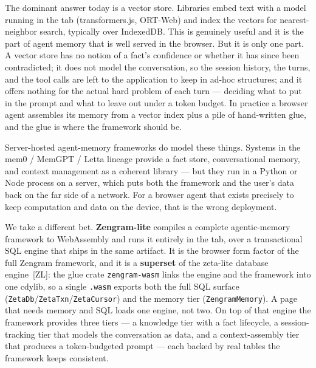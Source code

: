 \documentclass[11pt]{article}
\newcommand{\code}[1]{\texttt{#1}}
\begin{document}
The dominant answer today is a vector store. Libraries embed text with a model
running in the tab (transformers.js, ORT-Web) and index the vectors for
nearest-neighbor search, typically over IndexedDB. This is genuinely useful and
it is the part of agent memory that is well served in the browser. But it is only
one part. A vector store has no notion of a fact's confidence or whether it has
since been contradicted; it does not model the conversation, so the session
history, the turns, and the tool calls are left to the application to keep in
ad-hoc structures; and it offers nothing for the actual hard problem of each turn
--- deciding what to put in the prompt and what to leave out under a token
budget. In practice a browser agent assembles its memory from a vector index plus
a pile of hand-written glue, and the glue is where the framework should be.

Server-hosted agent-memory frameworks do model these things. Systems in the mem0
/ MemGPT / Letta lineage provide a fact store, conversational memory, and context
management as a coherent library --- but they run in a Python or Node process on
a server, which puts both the framework and the user's data back on the far side
of a network. For a browser agent that exists precisely to keep computation and
data on the device, that is the wrong deployment.

We take a different bet. \textbf{Zengram-lite} compiles a complete agentic-memory
framework to WebAssembly and runs it entirely in the tab, over a transactional
SQL engine that ships in the same artifact. It is the browser form factor of the
full Zengram framework, and it is a \textbf{superset} of the zeta-lite database
engine~[ZL]: the glue crate \code{zengram-wasm} links the engine and the
framework into one cdylib, so a single \code{.wasm} exports both the full SQL
surface (\code{ZetaDb}/\code{ZetaTxn}/\code{ZetaCursor}) and the memory tier
(\code{ZengramMemory}). A page that needs memory and SQL loads one engine, not
two. On top of that engine the framework provides three tiers --- a knowledge
tier with a fact lifecycle, a session-tracking tier that models the conversation
as data, and a context-assembly tier that produces a token-budgeted prompt ---
each backed by real tables the framework keeps consistent.
\end{document}
